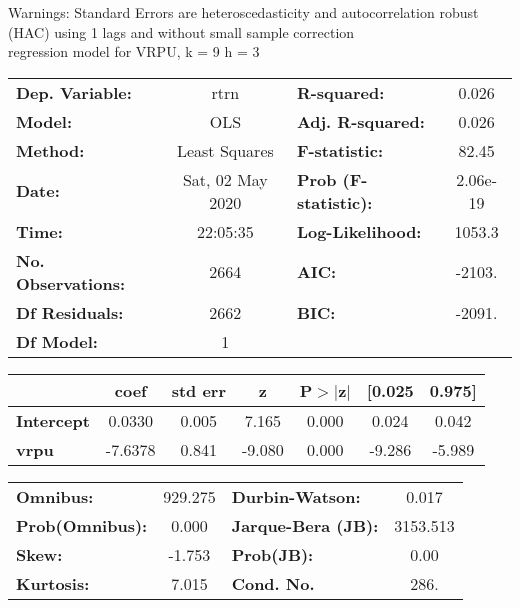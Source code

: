 Warnings: \newline
 [1] Standard Errors are heteroscedasticity and autocorrelation robust (HAC) using 1 lags and without small sample correction\\ 

regression model for VRPU, k = 9 h = 3\begin{center}
\begin{tabular}{lclc}
\toprule
\textbf{Dep. Variable:}    &       rtrn       & \textbf{  R-squared:         } &     0.026   \\
\textbf{Model:}            &       OLS        & \textbf{  Adj. R-squared:    } &     0.026   \\
\textbf{Method:}           &  Least Squares   & \textbf{  F-statistic:       } &     82.45   \\
\textbf{Date:}             & Sat, 02 May 2020 & \textbf{  Prob (F-statistic):} &  2.06e-19   \\
\textbf{Time:}             &     22:05:35     & \textbf{  Log-Likelihood:    } &    1053.3   \\
\textbf{No. Observations:} &        2664      & \textbf{  AIC:               } &    -2103.   \\
\textbf{Df Residuals:}     &        2662      & \textbf{  BIC:               } &    -2091.   \\
\textbf{Df Model:}         &           1      & \textbf{                     } &             \\
\bottomrule
\end{tabular}
\begin{tabular}{lcccccc}
                   & \textbf{coef} & \textbf{std err} & \textbf{z} & \textbf{P$> |$z$|$} & \textbf{[0.025} & \textbf{0.975]}  \\
\midrule
\textbf{Intercept} &       0.0330  &        0.005     &     7.165  &         0.000        &        0.024    &        0.042     \\
\textbf{vrpu}      &      -7.6378  &        0.841     &    -9.080  &         0.000        &       -9.286    &       -5.989     \\
\bottomrule
\end{tabular}
\begin{tabular}{lclc}
\textbf{Omnibus:}       & 929.275 & \textbf{  Durbin-Watson:     } &    0.017  \\
\textbf{Prob(Omnibus):} &   0.000 & \textbf{  Jarque-Bera (JB):  } & 3153.513  \\
\textbf{Skew:}          &  -1.753 & \textbf{  Prob(JB):          } &     0.00  \\
\textbf{Kurtosis:}      &   7.015 & \textbf{  Cond. No.          } &     286.  \\
\bottomrule
\end{tabular}
\end{center}


